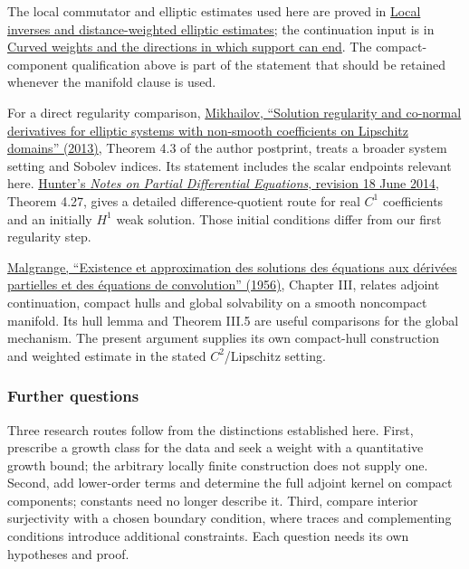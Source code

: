 \documentclass[
  11pt,
]{article}
\begin{document}
The local commutator and elliptic estimates used here are proved in
\href{local-elliptic-coefficients.pdf}{Local inverses and
distance-weighted elliptic estimates}; the continuation input is in
\href{support-continuation.pdf}{Curved weights and the directions in
which support can end}. The compact-component qualification above is
part of the statement that should be retained whenever the manifold
clause is used.

For a direct regularity comparison,
\href{https://bura.brunel.ac.uk/handle/2438/7239}{Mikhailov, ``Solution
regularity and co-normal derivatives for elliptic systems with
non-smooth coefficients on Lipschitz domains'' (2013)}, Theorem 4.3 of
the author postprint, treats a broader system setting and Sobolev
indices. Its statement includes the scalar endpoints relevant here.
\href{https://www.math.ucdavis.edu/~hunter/pdes/pde_notes.pdf}{Hunter's
\emph{Notes on Partial Differential Equations}, revision 18 June 2014},
Theorem 4.27, gives a detailed difference-quotient route for real
\(C^1\) coefficients and an initially \(H^1\) weak solution. Those
initial conditions differ from our first regularity step.

\href{https://aif.centre-mersenne.org/item/AIF_1956__6__271_0/}{Malgrange,
``Existence et approximation des solutions des équations aux dérivées
partielles et des équations de convolution'' (1956)}, Chapter III,
relates adjoint continuation, compact hulls and global solvability on a
smooth noncompact manifold. Its hull lemma and Theorem III.5 are useful
comparisons for the global mechanism. The present argument supplies its
own compact-hull construction and weighted estimate in the stated
\(C^2\)/Lipschitz setting.

\subsubsection{Further questions}\label{further-questions}

Three research routes follow from the distinctions established here.
First, prescribe a growth class for the data and seek a weight with a
quantitative growth bound; the arbitrary locally finite construction
does not supply one. Second, add lower-order terms and determine the
full adjoint kernel on compact components; constants need no longer
describe it. Third, compare interior surjectivity with a chosen boundary
condition, where traces and complementing conditions introduce
additional constraints. Each question needs its own hypotheses and
proof.
\end{document}
